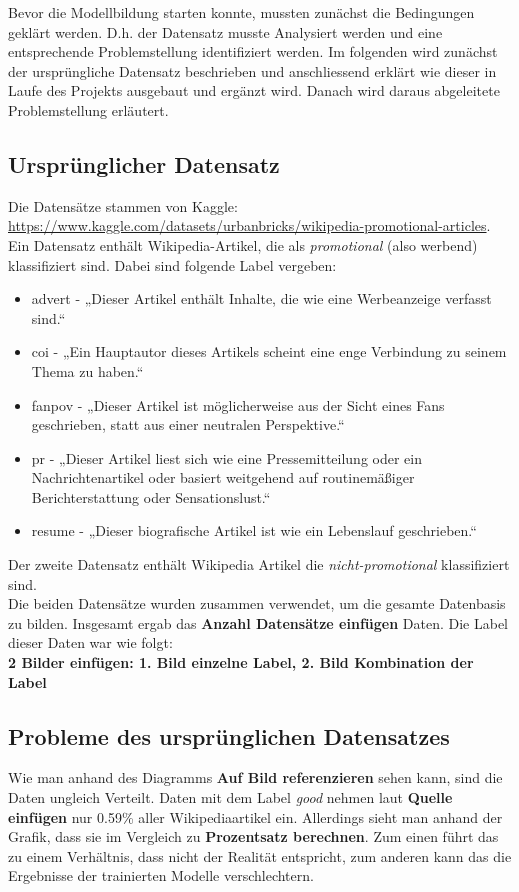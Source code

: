 
Bevor die Modellbildung starten konnte, mussten zunächst die Bedingungen geklärt werden. D.h. der Datensatz musste Analysiert werden und eine entsprechende Problemstellung identifiziert werden. Im folgenden wird zunächst der ursprüngliche Datensatz beschrieben und anschliessend erklärt wie dieser in Laufe des Projekts ausgebaut und ergänzt wird. Danach wird daraus abgeleitete Problemstellung erläutert.

\subsection{Ursprünglicher Datensatz}
Die Datensätze stammen von Kaggle: \url{https://www.kaggle.com/datasets/urbanbricks/wikipedia-promotional-articles}. Ein Datensatz enthält Wikipedia-Artikel, die als \emph{promotional} (also werbend) klassifiziert sind. Dabei sind folgende Label vergeben:
\begin{itemize}
    \item advert - „Dieser Artikel enthält Inhalte, die wie eine Werbeanzeige verfasst sind.“
    \item coi - „Ein Hauptautor dieses Artikels scheint eine enge Verbindung zu seinem Thema zu haben.“
    \item fanpov - „Dieser Artikel ist möglicherweise aus der Sicht eines Fans geschrieben, statt aus einer neutralen Perspektive.“
    \item pr - „Dieser Artikel liest sich wie eine Pressemitteilung oder ein Nachrichtenartikel oder basiert weitgehend auf routinemäßiger Berichterstattung oder Sensationslust.“
    \item resume - „Dieser biografische Artikel ist wie ein Lebenslauf geschrieben.“
\end{itemize}
Der zweite Datensatz enthält Wikipedia Artikel die \emph{nicht-promotional} klassifiziert sind. \\
Die beiden Datensätze wurden zusammen verwendet, um die gesamte Datenbasis zu bilden. Insgesamt ergab das \textbf{Anzahl Datensätze einfügen} Daten. Die Label dieser Daten war wie folgt: \\
\textbf{2 Bilder einfügen: 1. Bild einzelne Label, 2. Bild Kombination der Label}


\subsection{Probleme des ursprünglichen Datensatzes}
Wie man anhand des Diagramms \textbf{Auf Bild referenzieren} sehen kann, sind die Daten ungleich Verteilt. Daten mit dem Label \textit{good} nehmen laut \textbf{Quelle einfügen} nur 0.59\% aller Wikipediaartikel ein. Allerdings sieht man anhand der Grafik, dass sie im Vergleich zu \textbf{Prozentsatz berechnen}. Zum einen führt das zu einem Verhältnis, dass nicht der Realität entspricht, zum anderen kann das die Ergebnisse der trainierten Modelle verschlechtern.



